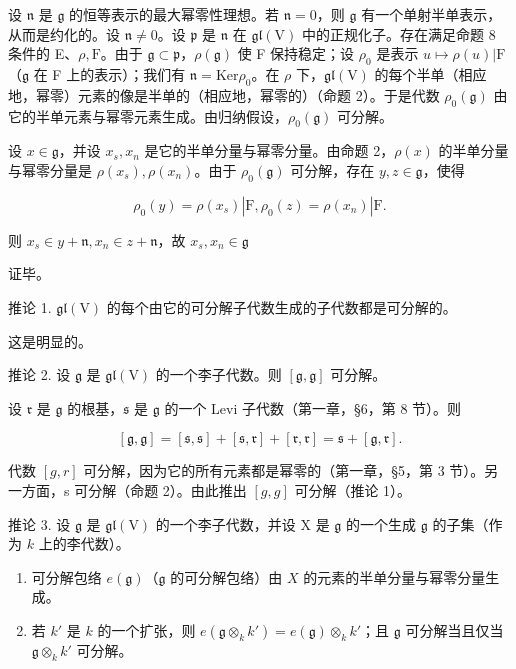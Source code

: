 设 \(\mathfrak{n}\) 是 \(\mathfrak{g}\) 的恒等表示的最大幂零性理想。若 \(\mathfrak{n} = 0\)，则 \(\mathfrak{g}\) 有一个单射半单表示，从而是约化的。设 \(\mathfrak{n} \neq 0\)。设 \(\mathfrak{p}\) 是 \(\mathfrak{n}\) 在 \(\mathfrak{gl}(\mathrm{V})\) 中的正规化子。存在满足命题 8 条件的 E、\(\rho, \mathrm{F}\)。由于 \(\mathfrak{g} \subset \mathfrak{p}\)，\(\rho(\mathfrak{g})\) 使 F 保持稳定；设 \(\rho_0\) 是表示 \(u \mapsto \rho(u)|\mathrm{F}\)（\(\mathfrak{g}\) 在 F 上的表示）；我们有 \(\mathfrak{n} = \mathrm{Ker}\rho_0\)。在 \(\rho\) 下，\(\mathfrak{gl}(\mathrm{V})\) 的每个半单（相应地，幂零）元素的像是半单的（相应地，幂零的）（命题 2）。于是代数 \(\rho_0(\mathfrak{g})\) 由它的半单元素与幂零元素生成。由归纳假设，\(\rho_0(\mathfrak{g})\) 可分解。

设 \(x \in \mathfrak{g}\)，并设 \(x_s, x_n\) 是它的半单分量与幂零分量。由命题 2，\(\rho(x)\) 的半单分量与幂零分量是 \(\rho(x_s), \rho(x_n)\)。由于 \(\rho_0(\mathfrak{g})\) 可分解，存在 \(y, z \in \mathfrak{g}\)，使得

\[
\rho_ {0} (y) = \rho (x _ {s}) | \mathrm{F}, \rho_ {0} (z) = \rho (x _ {n}) | \mathrm{F}.
\]

则 \(x_{s}\in y + \mathfrak{n},x_{n}\in z + \mathfrak{n}\)，故 \(x_{s},x_{n}\in \mathfrak{g}\)

证毕。

推论 1. \(\mathfrak{gl}(\mathrm{V})\) 的每个由它的可分解子代数生成的子代数都是可分解的。

这是明显的。

推论 2. 设 \(\mathfrak{g}\) 是 \(\mathfrak{gl}(\mathrm{V})\) 的一个李子代数。则 \([\mathfrak{g},\mathfrak{g}]\) 可分解。

设 \(\mathfrak{r}\) 是 \(\mathfrak{g}\) 的根基，\(\mathfrak{s}\) 是 \(\mathfrak{g}\) 的一个 Levi 子代数（第一章，§6，第 8 节）。则

\[
[ \mathfrak {g}, \mathfrak {g} ] = [ \mathfrak {s}, \mathfrak {s} ] + [ \mathfrak {s}, \mathfrak {r} ] + [ \mathfrak {r}, \mathfrak {r} ] = \mathfrak {s} + [ \mathfrak {g}, \mathfrak {r} ].
\]

代数 \([g,r]\) 可分解，因为它的所有元素都是幂零的（第一章，§5，第 3 节）。另一方面，s 可分解（命题 2）。由此推出 \([g,g]\) 可分解（推论 1）。

推论 3. 设 \(\mathfrak{g}\) 是 \(\mathfrak{gl}(\mathrm{V})\) 的一个李子代数，并设 \(\mathrm{X}\) 是 \(\mathfrak{g}\) 的一个生成 \(\mathfrak{g}\) 的子集（作为 \(k\) 上的李代数）。

\begin{enumerate}
\def\labelenumi{(\roman{enumi})}
\item
  可分解包络 \(e(\mathfrak{g})\)（\(\mathfrak{g}\) 的可分解包络）由 \(X\) 的元素的半单分量与幂零分量生成。
\item
  若 \(k'\) 是 \(k\) 的一个扩张，则 \(e(\mathfrak{g} \otimes_k k') = e(\mathfrak{g}) \otimes_k k'\)；且 \(\mathfrak{g}\) 可分解当且仅当 \(\mathfrak{g} \otimes_k k'\) 可分解。
\end{enumerate}

